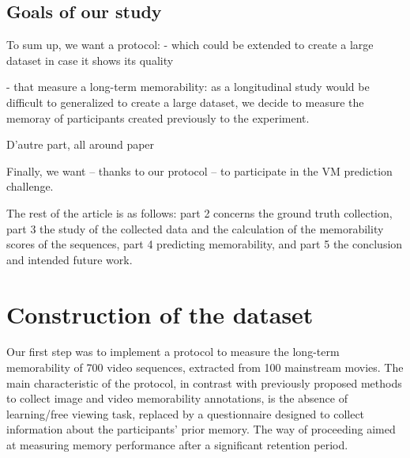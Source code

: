 \documentclass[sigconf]{acmart}
\begin{document}
\subsection{Goals of our study}
To sum up, we want a protocol:
- which could be extended to create a large dataset in case it shows its quality

- that measure a long-term memorability: as a longitudinal study would be difficult to generalized to create a large dataset, we decide to measure the memoray of participants created previously to the experiment.

D'autre part, all around paper

Finally, we want -- thanks to our protocol -- to participate in the VM prediction challenge.

The rest of the article is as follows: part 2 concerns the ground truth collection, part 3 the study of the collected data and the calculation of the memorability scores of the sequences, part 4 predicting memorability, and part 5 the conclusion and intended future work.






\section{Construction of the dataset}
Our first step was to implement a protocol to measure the long-term memorability of 700 video sequences, extracted from 100 mainstream movies.
The main characteristic of the protocol, in contrast with previously proposed methods to collect image and video memorability annotations, is the absence of learning/free viewing task, replaced by a questionnaire designed to collect information about the participants' prior memory.
The way of proceeding aimed at measuring memory performance after a significant retention period.
\end{document}
